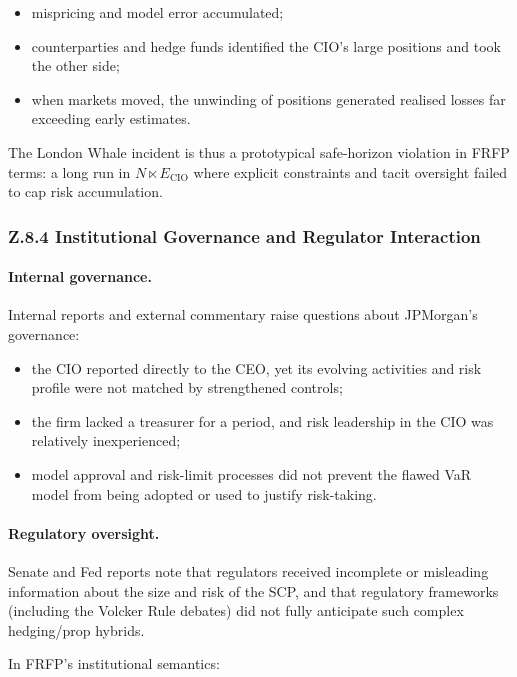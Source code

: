 \begin{itemize}
  \item mispricing and model error accumulated;
  \item counterparties and hedge funds identified the CIO’s large positions
        and took the other side;
  \item when markets moved, the unwinding of positions generated realised
        losses far exceeding early estimates.
\end{itemize}

The London Whale incident is thus a prototypical safe-horizon violation in
FRFP terms: a long run in \(N \ltimes E_{\mathrm{CIO}}\) where explicit
constraints and tacit oversight failed to cap risk accumulation.

\subsubsection*{Z.8.4 Institutional Governance and Regulator Interaction}

\paragraph{Internal governance.}
Internal reports and external commentary raise questions about JPMorgan’s
governance:

\begin{itemize}
  \item the CIO reported directly to the CEO, yet its evolving activities and
        risk profile were not matched by strengthened controls;
  \item the firm lacked a treasurer for a period, and risk leadership in the
        CIO was relatively inexperienced;
  \item model approval and risk-limit processes did not prevent the flawed
        VaR model from being adopted or used to justify risk-taking.
\end{itemize}

\paragraph{Regulatory oversight.}
Senate and Fed reports note that regulators received incomplete or
misleading information about the size and risk of the SCP, and that
regulatory frameworks (including the Volcker Rule debates) did not fully
anticipate such complex hedging/prop hybrids.

In FRFP’s institutional semantics:

